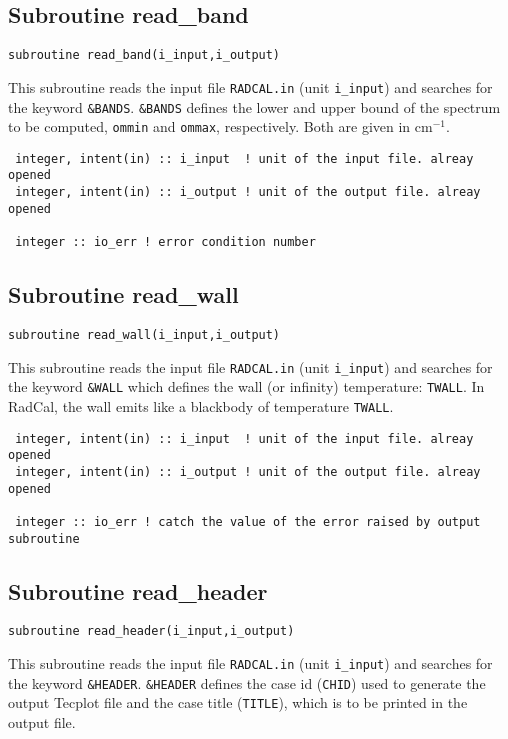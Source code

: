 \subsection{Subroutine read\_band}
\label{sub:read_band}
\begin{lstlisting}
subroutine read_band(i_input,i_output)
\end{lstlisting}
This subroutine reads the input file \verb=RADCAL.in= (unit \verb=i_input=) and searches for the keyword \verb=&BANDS=. \verb=&BANDS= defines the lower and upper bound of the spectrum to be computed, \verb=ommin= and \verb=ommax=, respectively. Both are given in cm$^{-1}$.

\begin{lstlisting}
 integer, intent(in) :: i_input  ! unit of the input file. alreay opened
 integer, intent(in) :: i_output ! unit of the output file. alreay opened

 integer :: io_err ! error condition number
\end{lstlisting}


\subsection{Subroutine read\_wall}
\label{sub:read_wall}
\begin{lstlisting}
subroutine read_wall(i_input,i_output)
\end{lstlisting}
 This subroutine reads the input file \verb=RADCAL.in= (unit \verb=i_input=) and searches for the keyword \verb=&WALL= which defines the wall (or infinity) temperature: \verb=TWALL=. In RadCal, the wall emits like a blackbody of temperature \verb=TWALL=.

\begin{lstlisting}
 integer, intent(in) :: i_input  ! unit of the input file. alreay opened
 integer, intent(in) :: i_output ! unit of the output file. alreay opened

 integer :: io_err ! catch the value of the error raised by output subroutine
\end{lstlisting}


\subsection{Subroutine read\_header}
\label{sub:read_header}

\begin{lstlisting}
subroutine read_header(i_input,i_output)
\end{lstlisting}
This subroutine reads the input file \verb=RADCAL.in= (unit \verb=i_input=) and searches for the keyword \verb=&HEADER=. \verb=&HEADER= defines the case id (\verb=CHID=) used to generate the output Tecplot file and the case title (\verb=TITLE=), which is to be printed in the output file.


